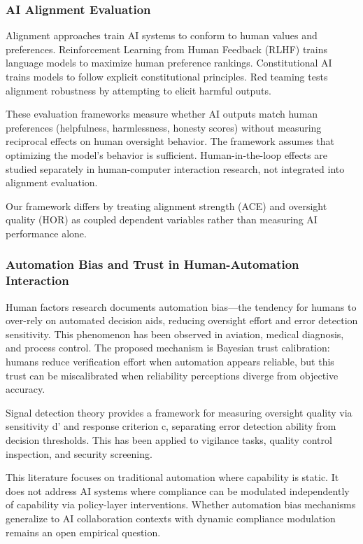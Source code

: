 
\subsubsection{AI Alignment Evaluation}

Alignment approaches train AI systems to conform to human values and preferences. Reinforcement Learning from Human Feedback (RLHF) trains language models to maximize human preference rankings. Constitutional AI trains models to follow explicit constitutional principles. Red teaming tests alignment robustness by attempting to elicit harmful outputs.

These evaluation frameworks measure whether AI outputs match human preferences (helpfulness, harmlessness, honesty scores) without measuring reciprocal effects on human oversight behavior. The framework assumes that optimizing the model's behavior is sufficient. Human-in-the-loop effects are studied separately in human-computer interaction research, not integrated into alignment evaluation.

Our framework differs by treating alignment strength (ACE) and oversight quality (HOR) as coupled dependent variables rather than measuring AI performance alone.

\subsubsection{Automation Bias and Trust in Human-Automation Interaction}

Human factors research documents automation bias—the tendency for humans to over-rely on automated decision aids, reducing oversight effort and error detection sensitivity. This phenomenon has been observed in aviation, medical diagnosis, and process control. The proposed mechanism is Bayesian trust calibration: humans reduce verification effort when automation appears reliable, but this trust can be miscalibrated when reliability perceptions diverge from objective accuracy.

Signal detection theory provides a framework for measuring oversight quality via sensitivity d' and response criterion c, separating error detection ability from decision thresholds. This has been applied to vigilance tasks, quality control inspection, and security screening.

This literature focuses on traditional automation where capability is static. It does not address AI systems where compliance can be modulated independently of capability via policy-layer interventions. Whether automation bias mechanisms generalize to AI collaboration contexts with dynamic compliance modulation remains an open empirical question.

